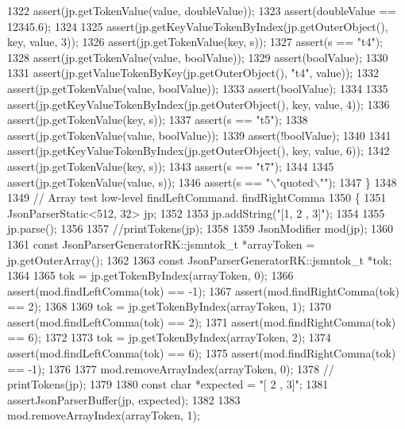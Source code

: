 \begin{DoxyCode}
{{{{{{{{{{{{{{{{{{{{{1322         assert(jp.getTokenValue(value, doubleValue));
1323         assert(doubleValue == 12345.6);
1324 
1325         assert(jp.getKeyValueTokenByIndex(jp.getOuterObject(), key, value, 3));
1326         assert(jp.getTokenValue(key, s));
1327         assert(s == \textcolor{stringliteral}{"t4"});
1328         assert(jp.getTokenValue(value, boolValue));
1329         assert(boolValue);
1330 
1331         assert(jp.getValueTokenByKey(jp.getOuterObject(), \textcolor{stringliteral}{"t4"}, value));
1332         assert(jp.getTokenValue(value, boolValue));
1333         assert(boolValue);
1334 
1335         assert(jp.getKeyValueTokenByIndex(jp.getOuterObject(), key, value, 4));
1336         assert(jp.getTokenValue(key, s));
1337         assert(s == \textcolor{stringliteral}{"t5"});
1338         assert(jp.getTokenValue(value, boolValue));
1339         assert(!boolValue);
1340 
1341         assert(jp.getKeyValueTokenByIndex(jp.getOuterObject(), key, value, 6));
1342         assert(jp.getTokenValue(key, s));
1343         assert(s == \textcolor{stringliteral}{"t7"});
1344 
1345         assert(jp.getTokenValue(value, s));
1346         assert(s == \textcolor{stringliteral}{"\(\backslash\)"quoted\(\backslash\)""});
1347     \}
1348 
1349     \textcolor{comment}{// Array test low-level findLeftCommand. findRightComma}
1350     \{
1351         JsonParserStatic<512, 32> jp;
1352 
1353         jp.addString(\textcolor{stringliteral}{"[1, 2 , 3]"});
1354 
1355         jp.parse();
1356 
1357         \textcolor{comment}{//printTokens(jp);}
1358 
1359         JsonModifier mod(jp);
1360 
1361         \textcolor{keyword}{const} JsonParserGeneratorRK::jsmntok_t *arrayToken = jp.getOuterArray();
1362 
1363         \textcolor{keyword}{const} JsonParserGeneratorRK::jsmntok_t *tok;
1364 
1365         tok = jp.getTokenByIndex(arrayToken, 0);
1366         assert(mod.findLeftComma(tok) == -1);
1367         assert(mod.findRightComma(tok) == 2);
1368 
1369         tok = jp.getTokenByIndex(arrayToken, 1);
1370         assert(mod.findLeftComma(tok) == 2);
1371         assert(mod.findRightComma(tok) == 6);
1372 
1373         tok = jp.getTokenByIndex(arrayToken, 2);
1374         assert(mod.findLeftComma(tok) == 6);
1375         assert(mod.findRightComma(tok) == -1);
1376 
1377         mod.removeArrayIndex(arrayToken, 0);
1378         \textcolor{comment}{// printTokens(jp);}
1379 
1380         \textcolor{keyword}{const} \textcolor{keywordtype}{char} *expected = \textcolor{stringliteral}{"[ 2 , 3]"};
1381         assertJsonParserBuffer(jp, expected);
1382 
1383         mod.removeArrayIndex(arrayToken, 1);
}}}}}}}}}}}}}}}}}}}}}
\end{DoxyCode}
